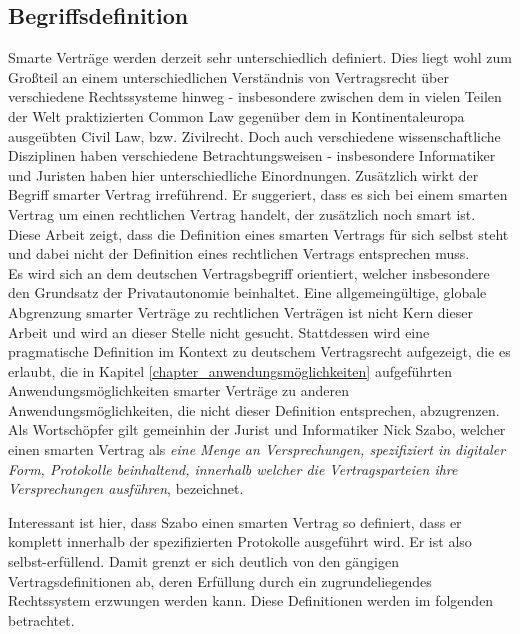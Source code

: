 \subsection{Begriffsdefinition}
Smarte Verträge werden derzeit sehr unterschiedlich definiert. Dies liegt wohl zum Großteil an einem unterschiedlichen Verständnis von Vertragsrecht über verschiedene Rechtssysteme hinweg - insbesondere zwischen dem in vielen Teilen der Welt praktizierten \glqq Common Law\grqq{} gegenüber dem in Kontinentaleuropa ausgeübten \glqq Civil Law\grqq{}, bzw. Zivilrecht. Doch auch verschiedene wissenschaftliche Disziplinen haben verschiedene Betrachtungsweisen - insbesondere Informatiker und Juristen haben hier unterschiedliche Einordnungen. Zusätzlich wirkt der Begriff smarter Vertrag irreführend. Er suggeriert, dass es sich bei einem smarten Vertrag um einen rechtlichen Vertrag handelt, der zusätzlich noch \glqq smart\grqq{} ist. Diese Arbeit zeigt, dass die Definition eines smarten Vertrags für sich selbst steht und dabei nicht der Definition eines rechtlichen Vertrags entsprechen muss.\\
Es wird sich an dem deutschen Vertragsbegriff orientiert, welcher insbesondere den Grundsatz der Privatautonomie beinhaltet. Eine allgemeingültige, globale Abgrenzung smarter Verträge zu rechtlichen Verträgen ist nicht Kern dieser Arbeit und wird an dieser Stelle nicht gesucht. Stattdessen wird eine pragmatische Definition im Kontext zu deutschem Vertragsrecht aufgezeigt, die es erlaubt, die in Kapitel \ref{chapter_anwendungsmöglichkeiten} aufgeführten Anwendungsmöglichkeiten smarter Verträge zu anderen Anwendungsmöglichkeiten, die nicht dieser Definition entsprechen, abzugrenzen.\\

Als Wortschöpfer gilt gemeinhin der Jurist und Informatiker Nick Szabo, welcher einen smarten Vertrag als \textit{\glqq eine Menge an Versprechungen, spezifiziert in digitaler Form, Protokolle beinhaltend, innerhalb welcher die Vertragsparteien ihre Versprechungen ausführen\grqq{}}, bezeichnet. \textit{\cite{Szabo.1996}}\\ 

Interessant ist hier, dass Szabo einen smarten Vertrag so definiert, dass er komplett innerhalb der spezifizierten Protokolle ausgeführt wird. Er ist also selbst-erfüllend. Damit grenzt er sich deutlich von den gängigen Vertragsdefinitionen ab,  deren Erfüllung durch ein zugrundeliegendes Rechtssystem erzwungen werden kann. Diese Definitionen werden im folgenden betrachtet.\\


